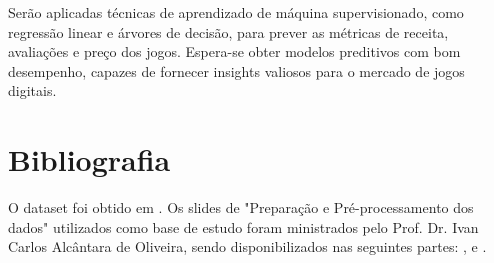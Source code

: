 \documentclass[12pt]{article}
\begin{document}
Serão aplicadas técnicas de aprendizado de máquina supervisionado, como regressão 
linear e árvores de decisão, para prever as métricas de receita, avaliações e 
preço dos jogos. Espera-se obter modelos preditivos com bom desempenho, capazes 
de fornecer insights valiosos para o mercado de jogos digitais.

\section{Bibliografia}

O dataset foi obtido em \cite{topcu2024top1500}.
Os slides de "Preparação e Pré-processamento dos dados" utilizados como base de 
estudo foram ministrados pelo Prof. Dr. Ivan Carlos Alcântara de Oliveira, sendo 
disponibilizados nas seguintes partes: 
\cite{professor_slides_2024parte1}, \cite{professor_slides_2024parte2} e 
\cite{professor_slides_2024parte3}.



\end{document}
